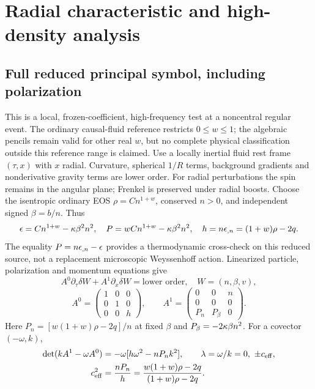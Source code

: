 \section{Radial characteristic and high-density analysis}
\subsection{Full reduced principal symbol, including polarization}
This is a local, frozen-coefficient, high-frequency test at a noncentral regular event. The ordinary causal-fluid reference restricts $0\leq w\leq1$; the algebraic pencils remain valid for other real $w$, but no complete physical classification outside this reference range is claimed. Use a locally inertial fluid rest frame $(\tau,x)$ with $x$ radial. Curvature, spherical $1/R$ terms, background gradients and nonderivative gravity terms are lower order. For radial perturbations the spin remains in the angular plane; Frenkel is preserved under radial boosts. Choose the isentropic ordinary EOS $\rho=Cn^{1+w}$, conserved $n>0$, and independent signed $\beta=b/n$. Thus
\begin{equation}
 \epsilon=Cn^{1+w}-\kappa\beta^2n^2,\quad
 P=wCn^{1+w}-\kappa\beta^2n^2,\quad h=n\epsilon_{,n}=(1+w)\rho-2q.
\end{equation}
The equality $P=n\epsilon_{,n}-\epsilon$ provides a thermodynamic cross-check on this reduced source, not a replacement microscopic Weyssenhoff action. Linearized particle, polarization and momentum equations give
\begin{equation}
 A^0\partial_\tau\delta W+A^1\partial_x\delta W=\text{lower order},\quad W=(n,\beta,v),
\end{equation}
\begin{equation}\label{eq:pencil}
 A^0=\begin{pmatrix}1&0&0\\0&1&0\\0&0&h\end{pmatrix},\qquad
 A^1=\begin{pmatrix}0&0&n\\0&0&0\\P_n&P_\beta&0\end{pmatrix}.
\end{equation}
Here $P_n=[w(1+w)\rho-2q]/n$ at fixed $\beta$ and $P_\beta=-2\kappa\beta n^2$. For a covector $(-\omega,k)$,
\begin{align}
 \det(kA^1-\omega A^0)&=-\omega[h\omega^2-nP_n k^2],\qquad
 \lambda=\omega/k=0,\ \pm c_{\rm eff},\nonumber\\
 c_{\rm eff}^2&=\frac{nP_n}{h}=\frac{w(1+w)\rho-2q}{(1+w)\rho-2q}.\label{eq:charpoly}
\end{align}
